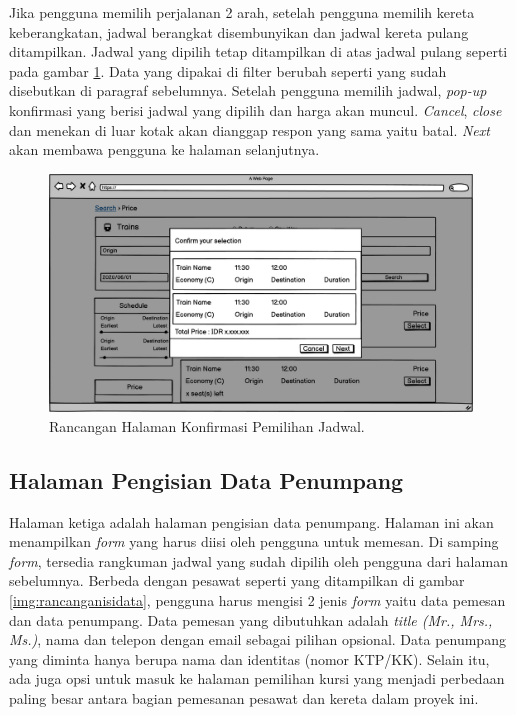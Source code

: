 Jika pengguna memilih perjalanan 2 arah, setelah pengguna memilih kereta keberangkatan, jadwal berangkat disembunyikan dan jadwal kereta pulang ditampilkan. Jadwal yang dipilih tetap ditampilkan di atas jadwal pulang seperti pada gambar \ref{img:rancangankonfirmasijadwal}. Data yang dipakai di filter berubah seperti yang sudah disebutkan di paragraf sebelumnya. Setelah pengguna memilih jadwal, \textit{pop-up} konfirmasi yang berisi jadwal yang dipilih dan harga akan muncul. \textit{Cancel}, \textit{close} dan menekan di luar kotak akan dianggap respon yang sama yaitu batal. \textit{Next} akan membawa pengguna ke halaman selanjutnya. 

\begin{figure}[H]
\center
\includegraphics[width=\textwidth,height=\textheight,keepaspectratio]{Gambar/Halaman Pemilihan Jadwal (Konfirmasi).png}
\caption{Rancangan Halaman Konfirmasi Pemilihan Jadwal.}
    \label{img:rancangankonfirmasijadwal}
\end{figure}

\subsection{Halaman Pengisian Data Penumpang}
\label{subsec:rancanganpengisiandata}

Halaman ketiga adalah halaman pengisian data penumpang. Halaman ini akan menampilkan \textit{form} yang harus diisi oleh pengguna untuk memesan. Di samping \textit{form}, tersedia rangkuman jadwal yang sudah dipilih oleh pengguna dari halaman sebelumnya. Berbeda dengan pesawat seperti yang ditampilkan di gambar \ref{img:rancanganisidata}, pengguna harus mengisi 2 jenis \textit{form} yaitu data pemesan dan data penumpang. Data pemesan yang dibutuhkan adalah \textit{title (Mr., Mrs., Ms.)}, nama dan telepon dengan email sebagai pilihan opsional. Data penumpang yang diminta hanya berupa nama dan identitas (nomor KTP/KK). Selain itu, ada juga opsi untuk masuk ke halaman pemilihan kursi yang menjadi perbedaan paling besar antara bagian pemesanan pesawat dan kereta dalam proyek ini.

